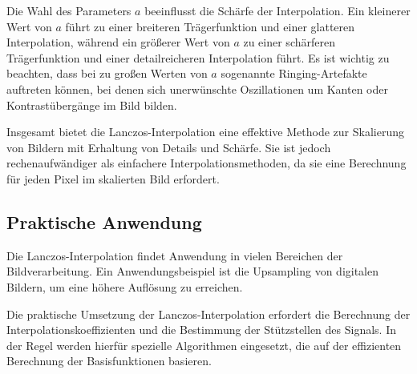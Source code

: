 Die Wahl des Parameters $a$ beeinflusst die Schärfe der Interpolation.
Ein kleinerer Wert von $a$ führt zu einer breiteren Trägerfunktion und einer glatteren Interpolation, während ein größerer Wert von $a$ zu einer schärferen Trägerfunktion und einer detailreicheren Interpolation führt.
Es ist wichtig zu beachten, dass bei zu großen Werten von $a$ sogenannte Ringing-Artefakte auftreten können, bei denen sich unerwünschte Oszillationen um Kanten oder Kontrastübergänge im Bild bilden.

Insgesamt bietet die Lanczos-Interpolation eine effektive Methode zur Skalierung von Bildern mit Erhaltung von Details und Schärfe.
Sie ist jedoch rechenaufwändiger als einfachere Interpolationsmethoden, da sie eine Berechnung für jeden Pixel im skalierten Bild erfordert.
~

\subsection{Praktische Anwendung}

Die Lanczos-Interpolation findet Anwendung in vielen Bereichen der Bildverarbeitung. 
Ein Anwendungsbeispiel ist die Upsampling von digitalen Bildern, um eine höhere Auflösung zu erreichen.

Die praktische Umsetzung der Lanczos-Interpolation erfordert die Berechnung der Interpolationskoeffizienten und die Bestimmung der Stützstellen des Signals. 
In der Regel werden hierfür spezielle Algorithmen eingesetzt, die auf der effizienten Berechnung der Basisfunktionen basieren.

